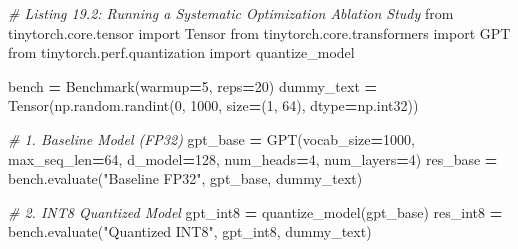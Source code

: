 \documentclass[
  letterpaper,
]{scrbook}
\newenvironment{Shaded}{\begin{snugshade}}{\end{snugshade}}
\newcommand{\CommentTok}[1]{\textcolor[rgb]{0.56,0.35,0.01}{\textit{#1}}}
\newcommand{\DecValTok}[1]{\textcolor[rgb]{0.00,0.00,0.81}{#1}}
\newcommand{\ImportTok}[1]{#1}
\newcommand{\NormalTok}[1]{#1}
\newcommand{\OperatorTok}[1]{\textcolor[rgb]{0.81,0.36,0.00}{\textbf{#1}}}
\newcommand{\StringTok}[1]{\textcolor[rgb]{0.31,0.60,0.02}{#1}}
\begin{document}
\begin{Shaded}
\begin{Highlighting}[]
\CommentTok{\# Listing 19.2: Running a Systematic Optimization Ablation Study}
\ImportTok{from}\NormalTok{ tinytorch.core.tensor }\ImportTok{import}\NormalTok{ Tensor}
\ImportTok{from}\NormalTok{ tinytorch.core.transformers }\ImportTok{import}\NormalTok{ GPT}
\ImportTok{from}\NormalTok{ tinytorch.perf.quantization }\ImportTok{import}\NormalTok{ quantize\_model}

\NormalTok{bench }\OperatorTok{=}\NormalTok{ Benchmark(warmup}\OperatorTok{=}\DecValTok{5}\NormalTok{, reps}\OperatorTok{=}\DecValTok{20}\NormalTok{)}
\NormalTok{dummy\_text }\OperatorTok{=}\NormalTok{ Tensor(np.random.randint(}\DecValTok{0}\NormalTok{, }\DecValTok{1000}\NormalTok{, size}\OperatorTok{=}\NormalTok{(}\DecValTok{1}\NormalTok{, }\DecValTok{64}\NormalTok{), dtype}\OperatorTok{=}\NormalTok{np.int32))}

\CommentTok{\# 1. Baseline Model (FP32)}
\NormalTok{gpt\_base }\OperatorTok{=}\NormalTok{ GPT(vocab\_size}\OperatorTok{=}\DecValTok{1000}\NormalTok{, max\_seq\_len}\OperatorTok{=}\DecValTok{64}\NormalTok{, d\_model}\OperatorTok{=}\DecValTok{128}\NormalTok{, num\_heads}\OperatorTok{=}\DecValTok{4}\NormalTok{, num\_layers}\OperatorTok{=}\DecValTok{4}\NormalTok{)}
\NormalTok{res\_base }\OperatorTok{=}\NormalTok{ bench.evaluate(}\StringTok{"Baseline FP32"}\NormalTok{, gpt\_base, dummy\_text)}

\CommentTok{\# 2. INT8 Quantized Model}
\NormalTok{gpt\_int8 }\OperatorTok{=}\NormalTok{ quantize\_model(gpt\_base)}
\NormalTok{res\_int8 }\OperatorTok{=}\NormalTok{ bench.evaluate(}\StringTok{"Quantized INT8"}\NormalTok{, gpt\_int8, dummy\_text)}


\end{Highlighting}
\end{Shaded}
\end{document}
